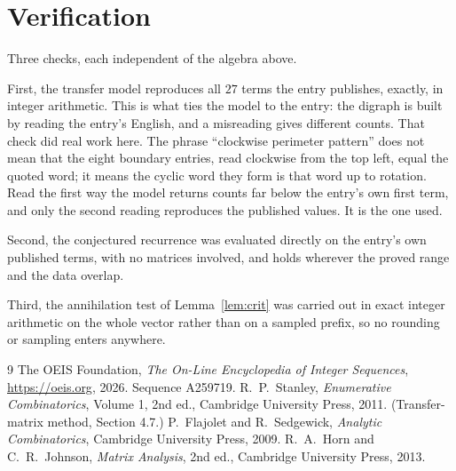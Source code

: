 \documentclass[11pt,a4paper]{article}
\theoremstyle{plain}
\theoremstyle{definition}
\begin{document}
\section{Verification}

Three checks, each independent of the algebra above.

First, the transfer model reproduces all $27$ terms the entry publishes, exactly, in
integer arithmetic. This is what ties the model to the entry: the digraph is built by reading
the entry's English, and a misreading gives different counts. That check did real work here. The phrase ``clockwise perimeter pattern'' does not mean that the eight boundary entries, read clockwise from the top left, equal the quoted word; it means the cyclic word they form is that word up to rotation. Read the first way the model returns counts far below the entry's own first term, and only the second reading reproduces the published values. It is the one used.

Second, the conjectured recurrence was evaluated directly on the entry's own published terms,
with no matrices involved, and holds wherever the proved range and the data overlap.

Third, the annihilation test of Lemma~\ref{lem:crit} was carried out in exact integer
arithmetic on the whole vector rather than on a sampled prefix, so no rounding or sampling
enters anywhere.

\begin{thebibliography}{9}
 The OEIS Foundation, \emph{The On-Line Encyclopedia of Integer
Sequences}, \url{https://oeis.org}, 2026. Sequence A259719.
 R.~P.~Stanley, \emph{Enumerative Combinatorics}, Volume 1, 2nd ed.,
Cambridge University Press, 2011. (Transfer-matrix method, Section 4.7.)
 P.~Flajolet and R.~Sedgewick, \emph{Analytic Combinatorics}, Cambridge
University Press, 2009.
 R.~A.~Horn and C.~R.~Johnson, \emph{Matrix Analysis}, 2nd ed., Cambridge
University Press, 2013.
\end{thebibliography}
\end{document}
